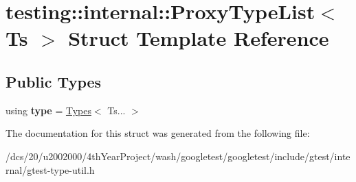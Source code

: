\hypertarget{structtesting_1_1internal_1_1ProxyTypeList}{}\section{testing\+:\+:internal\+:\+:Proxy\+Type\+List$<$ Ts $>$ Struct Template Reference}
\label{structtesting_1_1internal_1_1ProxyTypeList}
\subsection*{Public Types}
\begin{DoxyCompactItemize}
\item 
\mbox{\label{structtesting_1_1internal_1_1ProxyTypeList_a7a70316d957e6c48becd3130490da997}} 
using {\bfseries type} = \mbox{\hyperlink{structtesting_1_1internal_1_1Types}{Types}}$<$ Ts... $>$
\end{DoxyCompactItemize}


The documentation for this struct was generated from the following file\+:\begin{DoxyCompactItemize}
\item 
/dcs/20/u2002000/4th\+Year\+Project/wash/googletest/googletest/include/gtest/internal/gtest-\/type-\/util.\+h\end{DoxyCompactItemize}
